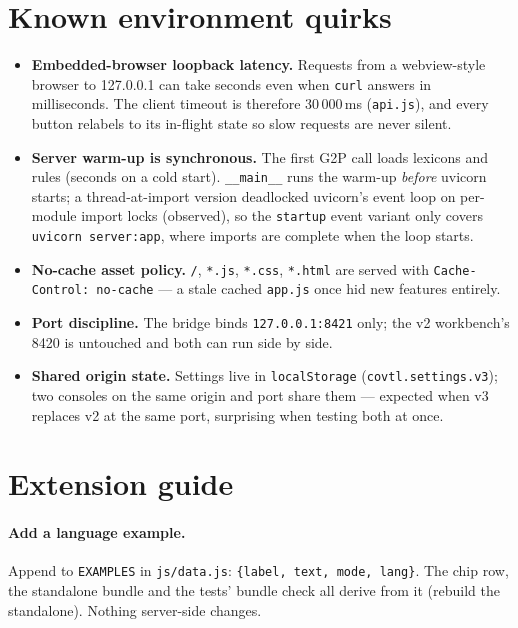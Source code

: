 \documentclass[11pt,a4paper]{article}
\begin{document}
\section{Known environment quirks}

\begin{itemize}
\item \textbf{Embedded-browser loopback latency.} Requests from a
  webview-style browser to 127.0.0.1 can take seconds even when
  \texttt{curl} answers in milliseconds. The client timeout is therefore
  30\,000\,ms (\texttt{api.js}), and every button relabels to its
  in-flight state so slow requests are never silent.
\item \textbf{Server warm-up is synchronous.} The first G2P call loads
  lexicons and rules (seconds on a cold start). \texttt{\_\_main\_\_}
  runs the warm-up \emph{before} uvicorn starts; a thread-at-import
  version deadlocked uvicorn's event loop on per-module import locks
  (observed), so the \texttt{startup} event variant only covers
  \texttt{uvicorn server:app}, where imports are complete when the loop
  starts.
\item \textbf{No-cache asset policy.} \texttt{/}, \texttt{*.js},
  \texttt{*.css}, \texttt{*.html} are served with
  \texttt{Cache-Control: no-cache} --- a stale cached \texttt{app.js}
  once hid new features entirely.
\item \textbf{Port discipline.} The bridge binds \texttt{127.0.0.1:8421}
  only; the v2 workbench's 8420 is untouched and both can run side by
  side.
\item \textbf{Shared origin state.} Settings live in
  \texttt{localStorage} (\texttt{covtl.settings.v3}); two consoles on
  the same origin and port share them --- expected when v3 replaces v2
  at the same port, surprising when testing both at once.
\end{itemize}

\section{Extension guide}

\paragraph{Add a language example.} Append to \texttt{EXAMPLES} in
\texttt{js/data.js}: \texttt{\{label, text, mode, lang\}}. The chip row,
the standalone bundle and the tests' bundle check all derive from it
(rebuild the standalone). Nothing server-side changes.
\end{document}
